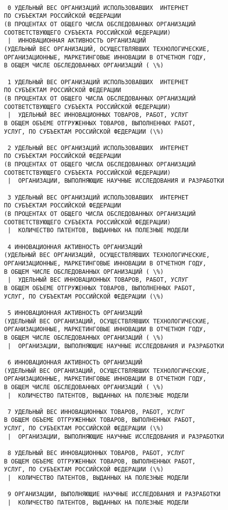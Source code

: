 \documentclass[11pt]{article}
\begin{document}
    \begin{Verbatim}[commandchars=\\\{\}]

 0 УДЕЛЬНЫЙ ВЕС ОРГАНИЗАЦИЙ ИСПОЛЬЗОВАВШИХ  ИНТЕРНЕТ
ПО СУБЪЕКТАМ РОССИЙСКОЙ ФЕДЕРАЦИИ
(В ПРОЦЕНТАХ ОТ ОБЩЕГО ЧИСЛА ОБСЛЕДОВАННЫХ ОРГАНИЗАЦИЙ
СООТВЕТСТВУЮЩЕГО СУБЪЕКТА РОССИЙСКОЙ ФЕДЕРАЦИИ) 
 |  ИННОВАЦИОННАЯ АКТИВНОСТЬ ОРГАНИЗАЦИЙ
(УДЕЛЬНЫЙ ВЕС ОРГАНИЗАЦИЙ, ОСУЩЕСТВЛЯВШИХ ТЕХНОЛОГИЧЕСКИЕ,
ОРГАНИЗАЦИОННЫЕ, МАРКЕТИНГОВЫЕ ИННОВАЦИИ В ОТЧЕТНОМ ГОДУ,
В ОБЩЕМ ЧИСЛЕ ОБСЛЕДОВАННЫХ ОРГАНИЗАЦИЙ ( \%)

 1 УДЕЛЬНЫЙ ВЕС ОРГАНИЗАЦИЙ ИСПОЛЬЗОВАВШИХ  ИНТЕРНЕТ
ПО СУБЪЕКТАМ РОССИЙСКОЙ ФЕДЕРАЦИИ
(В ПРОЦЕНТАХ ОТ ОБЩЕГО ЧИСЛА ОБСЛЕДОВАННЫХ ОРГАНИЗАЦИЙ
СООТВЕТСТВУЮЩЕГО СУБЪЕКТА РОССИЙСКОЙ ФЕДЕРАЦИИ) 
 |  УДЕЛЬНЫЙ ВЕС ИННОВАЦИОННЫХ ТОВАРОВ, РАБОТ, УСЛУГ
В ОБЩЕМ ОБЪЕМЕ ОТГРУЖЕННЫХ ТОВАРОВ, ВЫПОЛНЕННЫХ РАБОТ,
УСЛУГ, ПО СУБЪЕКТАМ РОССИЙСКОЙ ФЕДЕРАЦИИ (\%)

 2 УДЕЛЬНЫЙ ВЕС ОРГАНИЗАЦИЙ ИСПОЛЬЗОВАВШИХ  ИНТЕРНЕТ
ПО СУБЪЕКТАМ РОССИЙСКОЙ ФЕДЕРАЦИИ
(В ПРОЦЕНТАХ ОТ ОБЩЕГО ЧИСЛА ОБСЛЕДОВАННЫХ ОРГАНИЗАЦИЙ
СООТВЕТСТВУЮЩЕГО СУБЪЕКТА РОССИЙСКОЙ ФЕДЕРАЦИИ) 
 |  ОРГАНИЗАЦИИ, ВЫПОЛНЯЮЩИЕ НАУЧНЫЕ ИССЛЕДОВАНИЯ И РАЗРАБОТКИ

 3 УДЕЛЬНЫЙ ВЕС ОРГАНИЗАЦИЙ ИСПОЛЬЗОВАВШИХ  ИНТЕРНЕТ
ПО СУБЪЕКТАМ РОССИЙСКОЙ ФЕДЕРАЦИИ
(В ПРОЦЕНТАХ ОТ ОБЩЕГО ЧИСЛА ОБСЛЕДОВАННЫХ ОРГАНИЗАЦИЙ
СООТВЕТСТВУЮЩЕГО СУБЪЕКТА РОССИЙСКОЙ ФЕДЕРАЦИИ) 
 |  КОЛИЧЕСТВО ПАТЕНТОВ, ВЫДАННЫХ НА ПОЛЕЗНЫЕ МОДЕЛИ

 4 ИННОВАЦИОННАЯ АКТИВНОСТЬ ОРГАНИЗАЦИЙ
(УДЕЛЬНЫЙ ВЕС ОРГАНИЗАЦИЙ, ОСУЩЕСТВЛЯВШИХ ТЕХНОЛОГИЧЕСКИЕ,
ОРГАНИЗАЦИОННЫЕ, МАРКЕТИНГОВЫЕ ИННОВАЦИИ В ОТЧЕТНОМ ГОДУ,
В ОБЩЕМ ЧИСЛЕ ОБСЛЕДОВАННЫХ ОРГАНИЗАЦИЙ ( \%) 
 |  УДЕЛЬНЫЙ ВЕС ИННОВАЦИОННЫХ ТОВАРОВ, РАБОТ, УСЛУГ
В ОБЩЕМ ОБЪЕМЕ ОТГРУЖЕННЫХ ТОВАРОВ, ВЫПОЛНЕННЫХ РАБОТ,
УСЛУГ, ПО СУБЪЕКТАМ РОССИЙСКОЙ ФЕДЕРАЦИИ (\%)

 5 ИННОВАЦИОННАЯ АКТИВНОСТЬ ОРГАНИЗАЦИЙ
(УДЕЛЬНЫЙ ВЕС ОРГАНИЗАЦИЙ, ОСУЩЕСТВЛЯВШИХ ТЕХНОЛОГИЧЕСКИЕ,
ОРГАНИЗАЦИОННЫЕ, МАРКЕТИНГОВЫЕ ИННОВАЦИИ В ОТЧЕТНОМ ГОДУ,
В ОБЩЕМ ЧИСЛЕ ОБСЛЕДОВАННЫХ ОРГАНИЗАЦИЙ ( \%) 
 |  ОРГАНИЗАЦИИ, ВЫПОЛНЯЮЩИЕ НАУЧНЫЕ ИССЛЕДОВАНИЯ И РАЗРАБОТКИ

 6 ИННОВАЦИОННАЯ АКТИВНОСТЬ ОРГАНИЗАЦИЙ
(УДЕЛЬНЫЙ ВЕС ОРГАНИЗАЦИЙ, ОСУЩЕСТВЛЯВШИХ ТЕХНОЛОГИЧЕСКИЕ,
ОРГАНИЗАЦИОННЫЕ, МАРКЕТИНГОВЫЕ ИННОВАЦИИ В ОТЧЕТНОМ ГОДУ,
В ОБЩЕМ ЧИСЛЕ ОБСЛЕДОВАННЫХ ОРГАНИЗАЦИЙ ( \%) 
 |  КОЛИЧЕСТВО ПАТЕНТОВ, ВЫДАННЫХ НА ПОЛЕЗНЫЕ МОДЕЛИ

 7 УДЕЛЬНЫЙ ВЕС ИННОВАЦИОННЫХ ТОВАРОВ, РАБОТ, УСЛУГ
В ОБЩЕМ ОБЪЕМЕ ОТГРУЖЕННЫХ ТОВАРОВ, ВЫПОЛНЕННЫХ РАБОТ,
УСЛУГ, ПО СУБЪЕКТАМ РОССИЙСКОЙ ФЕДЕРАЦИИ (\%) 
 |  ОРГАНИЗАЦИИ, ВЫПОЛНЯЮЩИЕ НАУЧНЫЕ ИССЛЕДОВАНИЯ И РАЗРАБОТКИ

 8 УДЕЛЬНЫЙ ВЕС ИННОВАЦИОННЫХ ТОВАРОВ, РАБОТ, УСЛУГ
В ОБЩЕМ ОБЪЕМЕ ОТГРУЖЕННЫХ ТОВАРОВ, ВЫПОЛНЕННЫХ РАБОТ,
УСЛУГ, ПО СУБЪЕКТАМ РОССИЙСКОЙ ФЕДЕРАЦИИ (\%) 
 |  КОЛИЧЕСТВО ПАТЕНТОВ, ВЫДАННЫХ НА ПОЛЕЗНЫЕ МОДЕЛИ

 9 ОРГАНИЗАЦИИ, ВЫПОЛНЯЮЩИЕ НАУЧНЫЕ ИССЛЕДОВАНИЯ И РАЗРАБОТКИ 
 |  КОЛИЧЕСТВО ПАТЕНТОВ, ВЫДАННЫХ НА ПОЛЕЗНЫЕ МОДЕЛИ

    \end{Verbatim}
\end{document}
